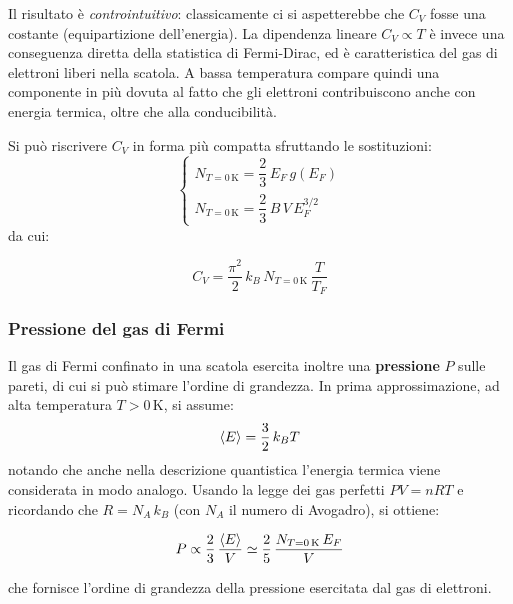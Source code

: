 \begin{remark}
Il risultato è \emph{controintuitivo}: classicamente ci si aspetterebbe che \(C_V\) fosse una costante (equipartizione dell'energia). La dipendenza lineare \(C_V \propto T\) è invece una conseguenza diretta della statistica di Fermi-Dirac, ed è caratteristica del gas di elettroni liberi nella scatola. A bassa temperatura compare quindi una componente in più dovuta al fatto che gli elettroni contribuiscono anche con energia termica, oltre che alla conducibilità.
\end{remark}

Si può riscrivere \(C_V\) in forma più compatta sfruttando le sostituzioni:
\begin{equation}
    \begin{cases}
        N_{T = 0\,\text{K}} = \dfrac{2}{3}\, E_F\, g(E_F) \\[4pt]
        N_{T = 0\,\text{K}} = \dfrac{2}{3}\, B\, V\, E_F^{3/2}
    \end{cases}
\end{equation}
da cui:
\begin{importantbox}
    \begin{equation}
        C_V = \frac{\pi^2}{2}\, k_B\, N_{T = 0\,\text{K}}\, \frac{T}{T_F}
    \end{equation}
\end{importantbox}

\subsubsection{Pressione del gas di Fermi}

Il gas di Fermi confinato in una scatola esercita inoltre una \textbf{pressione} \(P\) sulle pareti, di cui si può stimare l'ordine di grandezza. In prima approssimazione, ad alta temperatura \(T > 0\,\text{K}\), si assume:
\begin{equation}
    \expval{E} = \frac{3}{2}\, k_B T
\end{equation}
notando che anche nella descrizione quantistica l'energia termica viene considerata in modo analogo. Usando la legge dei gas perfetti \(PV = nRT\) e ricordando che \(R = N_A\, k_B\) (con \(N_A\) il numero di Avogadro), si ottiene:
\begin{importantbox}
    \begin{equation}
        P \propto \frac{2}{3}\, \frac{\expval{E}}{V} \simeq \frac{2}{5}\, \frac{N_{T = 0\,\text{K}}\, E_F}{V}
    \end{equation}
\end{importantbox}
che fornisce l'ordine di grandezza della pressione esercitata dal gas di elettroni.

